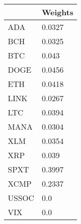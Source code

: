 \begin{tabular}{ll}
\toprule
 & Weights \\
\midrule
ADA & 0.0327 \\
BCH & 0.0325 \\
BTC & 0.043 \\
DOGE & 0.0456 \\
ETH & 0.0418 \\
LINK & 0.0267 \\
LTC & 0.0394 \\
MANA & 0.0304 \\
XLM & 0.0354 \\
XRP & 0.039 \\
SPXT & 0.3997 \\
XCMP & 0.2337 \\
USSOC & 0.0 \\
VIX & 0.0 \\
\bottomrule
\end{tabular}
